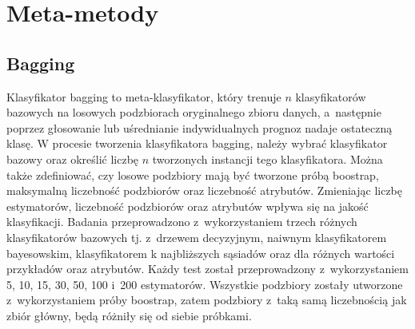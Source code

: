 \chapter{Meta-metody}
\section{Bagging}
Klasyfikator bagging to meta-klasyfikator, który trenuje $n$ klasyfikatorów bazowych na losowych podzbiorach oryginalnego zbioru danych, a~następnie poprzez głosowanie lub uśrednianie indywidualnych prognoz nadaje ostateczną klasę. W procesie tworzenia klasyfikatora bagging, należy wybrać klasyfikator bazowy oraz określić liczbę $n$ tworzonych instancji tego klasyfikatora. Można także zdefiniować, czy losowe podzbiory mają być tworzone próbą boostrap, maksymalną liczebność podzbiorów oraz liczebność atrybutów. Zmieniając liczbę estymatorów, liczebność podzbiorów oraz atrybutów wpływa się na jakość klasyfikacji. Badania przeprowadzono z~wykorzystaniem trzech różnych klasyfikatorów bazowych tj. z~drzewem decyzyjnym, naiwnym klasyfikatorem bayesowskim, klasyfikatorem k najbliższych sąsiadów oraz dla różnych wartości przykładów oraz atrybutów. Każdy test został przeprowadzony z~wykorzystaniem 5, 10, 15, 30, 50, 100 i~200 estymatorów. Wszystkie podzbiory zostały utworzone z~wykorzystaniem próby boostrap, zatem podzbiory z~taką samą liczebnością jak zbiór główny, będą różniły się od siebie próbkami.
  
